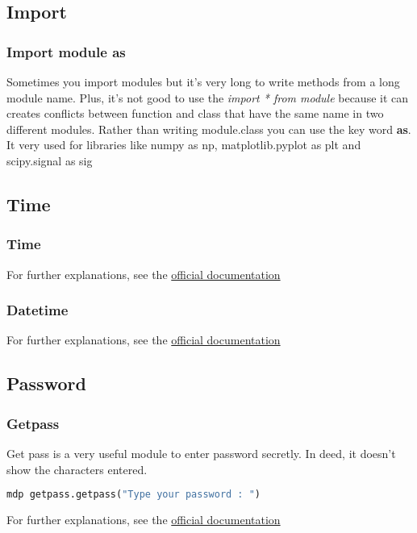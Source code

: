 \documentclass[a4paper, 12pt, titlepage]{scrartcl} %
\begin{document}
\subsection{Import}
\label{subsec:Import}

\subsubsection{Import module as}
Sometimes you import modules but it's very long to write methods from a long module name. Plus, it's not good to use the \textit{import * from module} because it can creates conflicts between function and class that have the same name in two different modules. Rather than writing module.class you can use the key word \textbf{as}. It very used for libraries like numpy as np, matplotlib.pyplot as plt and scipy.signal as sig
\label{As}

\subsection{Time}
\subsubsection{Time}
For further explanations, see the \href{https://docs.python.org/3/library/time.html}{official documentation}

\subsubsection{Datetime}
For further explanations, see the \href{https://docs.python.org/3/library/datetime.html}{official documentation}

\subsection{Password}

\subsubsection{Getpass}
Get pass is a very useful module to enter password secretly. In deed, it doesn't show the characters entered.
\begin{lstlisting}[language=Python]
mdp getpass.getpass("Type your password : ")
\end{lstlisting} \vspace{5mm}

For further explanations, see the \href{https://docs.python.org/3/library/getpass.html}{official documentation}
\end{document}
